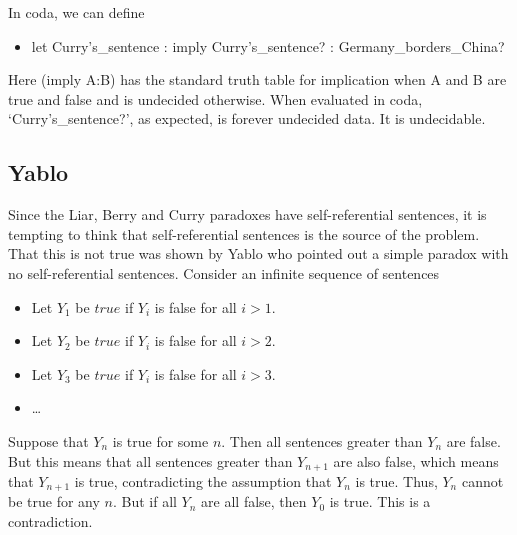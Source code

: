 \documentclass[11pt]{article}
\begin{document}
In coda, we can define
\begin{itemize}
\item let Curry's\_sentence : imply Curry's\_sentence? : Germany\_borders\_China?
\end{itemize}
Here (imply A:B) has the standard truth table for implication when A and B are true and false and
is undecided otherwise.  When evaluated in coda, `Curry's\_sentence?', as expected, is forever undecided data.  It is undecidable.

\subsection{Yablo}

     Since the Liar, Berry and Curry paradoxes have self-referential sentences, it is tempting to think
that self-referential sentences is the source of the problem.  That this is not true was shown by Yablo\cite{Yablo} who
pointed out a simple paradox with no self-referential sentences.  Consider an infinite sequence
of sentences
\begin{itemize}
\item Let $Y_1$ be $true$ if $Y_i$ is false for all $i>1$.
\item Let $Y_2$ be $true$ if $Y_i$ is false for all $i>2$.
\item Let $Y_3$ be $true$ if $Y_i$ is false for all $i>3$.
\item \dots
\end{itemize}
Suppose that $Y_n$ is true for some $n$.  Then all sentences greater than $Y_n$ are false.  But this means
that all sentences greater than $Y_{n+1}$ are also false, which means that $Y_{n+1}$ is true, contradicting
the assumption that $Y_n$ is true.  Thus, $Y_n$ cannot be true for any $n$.  But if all $Y_n$ are all false, then
$Y_0$ is true.  This is a contradiction.
\end{document}
